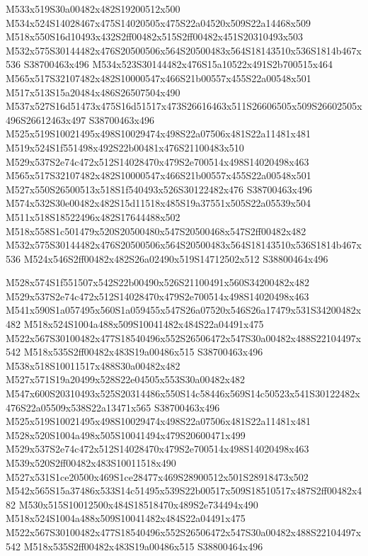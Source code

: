 \documentclass{article}
\begin{document}
\begin{multicols}{2}
M533x519S30a00482x482S19200512x500 M534x524S14028467x475S14020505x475S22a04520x509S22a14468x509 M518x550S16d10493x432S2ff00482x515S2ff00482x451S20310493x503 M532x575S30144482x476S20500506x564S20500483x564S18143510x536S1814b467x536 S38700463x496 M534x523S30144482x476S15a10522x491S2b700515x464 M565x517S32107482x482S10000547x466S21b00557x455S22a00548x501 M517x513S15a20484x486S26507504x490 M537x527S16d51473x475S16d51517x473S26616463x511S26606505x509S26602505x496S26612463x497 S38700463x496 M525x519S10021495x498S10029474x498S22a07506x481S22a11481x481 M519x524S1f551498x492S22b00481x476S21100483x510 M529x537S2e74c472x512S14028470x479S2e700514x498S14020498x463 M565x517S32107482x482S10000547x466S21b00557x455S22a00548x501 M527x550S26500513x518S1f540493x526S30122482x476 S38700463x496 M574x532S30e00482x482S15d11518x485S19a37551x505S22a05539x504 M511x518S18522496x482S17644488x502 M518x558S1c501479x520S20500480x547S20500468x547S2ff00482x482 M532x575S30144482x476S20500506x564S20500483x564S18143510x536S1814b467x536 M524x546S2ff00482x482S26a02490x519S14712502x512 S38800464x496

M528x574S1f551507x542S22b00490x526S21100491x560S34200482x482 M529x537S2e74c472x512S14028470x479S2e700514x498S14020498x463 M541x590S1a057495x560S1a059455x547S26a07520x546S26a17479x531S34200482x482 M518x524S1004a488x509S10041482x484S22a04491x475 M522x567S30100482x477S18540496x552S26506472x547S30a00482x488S22104497x542 M518x535S2ff00482x483S19a00486x515 S38700463x496 M538x518S10011517x488S30a00482x482 M527x571S19a20499x528S22e04505x553S30a00482x482 M547x600S20310493x525S20314486x550S14c58446x569S14c50523x541S30122482x476S22a05509x538S22a13471x565 S38700463x496 M525x519S10021495x498S10029474x498S22a07506x481S22a11481x481 M528x520S1004a498x505S10041494x479S20600471x499 M529x537S2e74c472x512S14028470x479S2e700514x498S14020498x463 M539x520S2ff00482x483S10011518x490 M527x531S1ce20500x469S1ce28477x469S28900512x501S28918473x502 M542x565S15a37486x533S14c51495x539S22b00517x509S18510517x487S2ff00482x482 M530x515S10012500x484S18518470x489S2e734494x490 M518x524S1004a488x509S10041482x484S22a04491x475 M522x567S30100482x477S18540496x552S26506472x547S30a00482x488S22104497x542 M518x535S2ff00482x483S19a00486x515 S38800464x496


\end{multicols}
\end{document}
